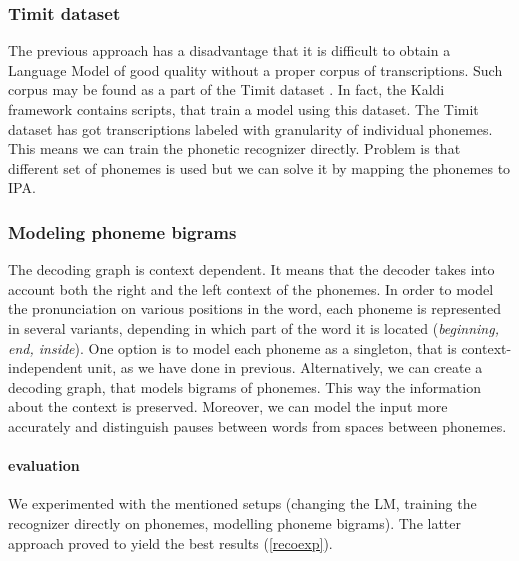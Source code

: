 \subsubsection{Timit dataset}
The previous approach has a disadvantage that it is difficult to obtain a Language Model of good quality without a proper corpus of transcriptions.
Such corpus may be found as a part of the Timit dataset \cite{lopes2011phoneme}.
In fact, the Kaldi framework contains scripts, that train a model using this dataset.
The Timit dataset has got transcriptions labeled with granularity of individual phonemes.
This means we can train the phonetic recognizer directly.
Problem is that different set of phonemes is used but we can solve it by mapping the phonemes to IPA. 
\subsubsection{Modeling phoneme bigrams}
The decoding graph is context dependent. 
It means that the decoder takes into account both the right and the left context of the phonemes. 
In order to model the pronunciation on various positions in the word, each phoneme is represented in several variants, depending in which part of the word it is located (\textit{beginning, end, inside}). 
One option is to model each phoneme as a singleton, that is context-independent unit, as we have done in previous.
Alternatively, we can create a decoding graph, that models bigrams of phonemes.
This way the information about the context is preserved.
Moreover, we can model the input more accurately and distinguish pauses between words from spaces between phonemes.
\paragraph{evaluation}
We experimented with the mentioned setups (changing the LM, training the recognizer directly on phonemes, modelling phoneme bigrams).
The latter approach proved to yield the best results (\ref{recoexp}).
